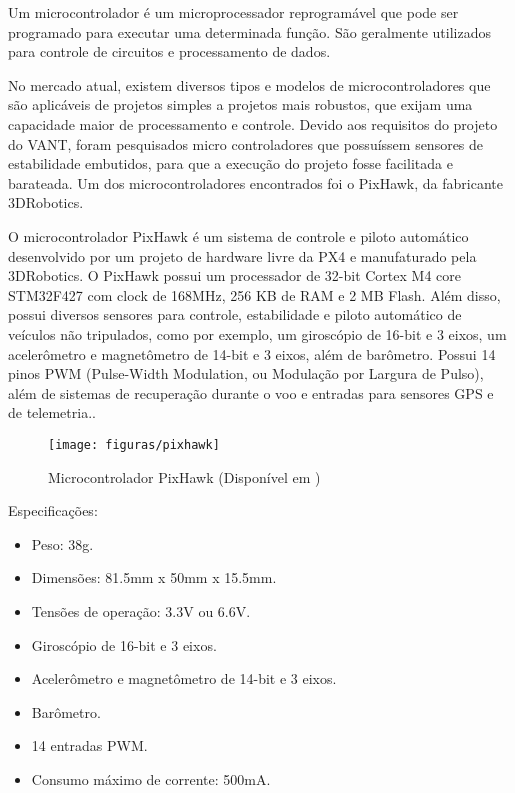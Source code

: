 
Um microcontrolador é um microprocessador reprogramável que pode ser programado para executar uma determinada função. São geralmente utilizados para controle de circuitos e processamento de dados.

No mercado atual, existem diversos tipos e modelos de microcontroladores que são aplicáveis de projetos simples a projetos mais robustos, que exijam uma capacidade maior de processamento e controle. Devido aos requisitos do projeto do VANT, foram pesquisados micro controladores que possuíssem sensores de estabilidade embutidos, para que a execução do projeto fosse facilitada e barateada. Um dos microcontroladores encontrados foi o PixHawk, da fabricante 3DRobotics.

O microcontrolador PixHawk é um sistema de controle e piloto automático desenvolvido por um projeto de hardware livre da PX4 e manufaturado pela 3DRobotics. O PixHawk possui um processador de 32-bit Cortex M4 core STM32F427 com clock de 168MHz, 256 KB de RAM e 2 MB Flash. Além disso, possui diversos sensores para controle, estabilidade e piloto automático de veículos não tripulados, como por exemplo, um giroscópio de 16-bit e 3 eixos, um acelerômetro e magnetômetro de 14-bit e 3 eixos, além de barômetro. Possui 14 pinos PWM (Pulse-Width Modulation, ou Modulação por Largura de Pulso), além de sistemas de recuperação durante o voo e entradas para sensores GPS e de telemetria.\cite{3drobotics2014}.

\begin{figure}[H]
\centering\texttt{[image: figuras/pixhawk]}
\caption{Microcontrolador PixHawk (Disponível em \cite{amazon2014})}
\end{figure}

Especificações:

\begin{itemize}
	\item Peso: 38g.
	\item Dimensões: 81.5mm x 50mm x 15.5mm.
	\item Tensões de operação: 3.3V ou 6.6V.
	\item Giroscópio de 16-bit e 3 eixos.
	\item Acelerômetro e magnetômetro de 14-bit e 3 eixos.
	\item Barômetro.
	\item 14 entradas PWM.
	\item Consumo máximo de corrente: 500mA.
\end{itemize}

